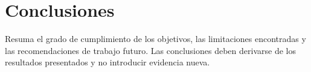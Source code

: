 \section{Conclusiones}

Resuma el grado de cumplimiento de los objetivos, las limitaciones encontradas
y las recomendaciones de trabajo futuro. Las conclusiones deben derivarse de
los resultados presentados y no introducir evidencia nueva.
